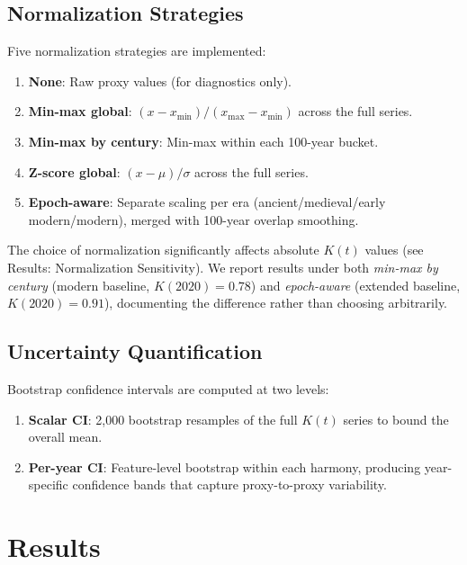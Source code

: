 \documentclass[10pt,letterpaper]{article}
\newcommand{\kt}{$K(t)$}
\begin{document}
\subsection*{Normalization Strategies}

Five normalization strategies are implemented:
\begin{enumerate}
\item \textbf{None}: Raw proxy values (for diagnostics only).
\item \textbf{Min-max global}: $(x - x_{\min}) / (x_{\max} - x_{\min})$ across the full series.
\item \textbf{Min-max by century}: Min-max within each 100-year bucket.
\item \textbf{Z-score global}: $(x - \mu) / \sigma$ across the full series.
\item \textbf{Epoch-aware}: Separate scaling per era (ancient/medieval/early modern/modern),
      merged with 100-year overlap smoothing.
\end{enumerate}

The choice of normalization significantly affects absolute \kt{} values
(see Results: Normalization Sensitivity). We report results under both
\emph{min-max by century} (modern baseline, $K(2020) = 0.78$) and
\emph{epoch-aware} (extended baseline, $K(2020) = 0.91$), documenting
the difference rather than choosing arbitrarily.

\subsection*{Uncertainty Quantification}

Bootstrap confidence intervals are computed at two levels:
\begin{enumerate}
\item \textbf{Scalar CI}: 2,000 bootstrap resamples of the full \kt{}
      series to bound the overall mean.
\item \textbf{Per-year CI}: Feature-level bootstrap within each harmony,
      producing year-specific confidence bands that capture proxy-to-proxy
      variability.
\end{enumerate}

\section*{Results}
\end{document}
